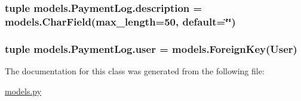 \hypertarget{classmodels_1_1_payment_log_ae48129a7de427884354b091e16520e94}{
\subsubsection[{description}]{\setlength{\rightskip}{0pt plus 5cm}tuple models.\-Payment\-Log.\-description = models.\-Char\-Field(max\-\_\-length=50, default=\char`\"{}\char`\"{})\hspace{0.3cm}{\ttfamily [static]}}}\label{classmodels_1_1_payment_log_ae48129a7de427884354b091e16520e94}
\hypertarget{classmodels_1_1_payment_log_ac72c158a814c97350349db0a8a091c12}{
\subsubsection[{user}]{\setlength{\rightskip}{0pt plus 5cm}tuple models.\-Payment\-Log.\-user = models.\-Foreign\-Key(User)\hspace{0.3cm}{\ttfamily [static]}}}\label{classmodels_1_1_payment_log_ac72c158a814c97350349db0a8a091c12}


The documentation for this class was generated from the following file\-:\begin{DoxyCompactItemize}
\item 
\hyperlink{models_8py}{models.\-py}\end{DoxyCompactItemize}
